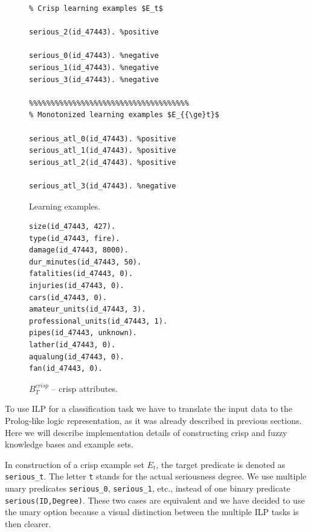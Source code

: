 \begin{figure}[b!]
\begin{minipage}[b]{0.5\hsize}
\begin{verbatim}
% Crisp learning examples $E_t$

serious_2(id_47443). %positive

serious_0(id_47443). %negative
serious_1(id_47443). %negative
serious_3(id_47443). %negative							

%%%%%%%%%%%%%%%%%%%%%%%%%%%%%%%%%%%%%
% Monotonized learning examples $E_{{\ge}t}$

serious_atl_0(id_47443). %positive
serious_atl_1(id_47443). %positive
serious_atl_2(id_47443). %positive

serious_atl_3(id_47443). %negative					
\end{verbatim}						
	\caption{Learning examples.}
	\label{fig:examples}
\end{minipage}
\hspace{0.5cm}
\begin{minipage}[b]{0.5\hsize}
\begin{verbatim}
size(id_47443, 427).
type(id_47443, fire).
damage(id_47443, 8000).
dur_minutes(id_47443, 50).
fatalities(id_47443, 0).
injuries(id_47443, 0).
cars(id_47443, 0).
amateur_units(id_47443, 3).
professional_units(id_47443, 1).
pipes(id_47443, unknown).
lather(id_47443, 0).
aqualung(id_47443, 0).
fan(id_47443, 0).
\end{verbatim}						
	\caption{$B^{crisp}_{T}$ -- crisp attributes.}
	\label{fig:crisp_attributes}
\end{minipage}
\end{figure}






To use ILP for a classification task we have to translate the input data to the Prolog-like logic representation, as it was already described in previous sections. Here we will describe implementation details of constructing crisp and fuzzy knowledge bases and example sets.

In construction of a crisp example set $E_t$, the target predicate is denoted as \texttt{serious\_t}. The letter \texttt{t} stands for the actual seriousness degree. We use multiple unary predicates \texttt{serious\_0}, \texttt{serious\_1}, etc., instead of one binary predicate \texttt{serious(ID,Degree)}. These two cases are equivalent and we have decided to use the unary option because a visual distinction between the multiple ILP tasks is then clearer.

